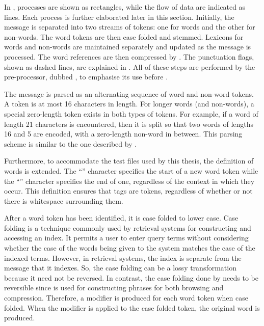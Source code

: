 In , processes are shown as
rectangles, while the flow of data are indicated as lines.
Each process is further elaborated later in this section.
Initially, the message is separated into two streams of tokens:
one for words and the other for non-words.  The word tokens are then
case folded and stemmed. Lexicons for words and non-words
are maintained separately and updated as the message is processed.  The word
references are then compressed by \repair.  The punctuation flags,
shown as dashed lines, are explained in .
All of these steps are performed by the 
pre-processor, dubbed \prepair, to emphasise its use before
\repair.


The message is parsed as an alternating sequence of word
and non-word tokens.  A token is at most 16 characters in
length.  For longer words (and non-words), a special
zero-length token exists in both types of tokens.  For
example, if a word of length 21 characters is encountered,
then it is split so that two words of lengths 16 and 5
are encoded, with a zero-length non-word in between.  
This parsing scheme is similar to the one described by 
\citet{moffat89:spe}.

Furthermore, to accommodate the \sgml test files used by this
thesis, the definition of words is extended.  The ``\tl''
character specifies the start of a new word token while 
the ``\tg'' character specifies the end of one, regardless of the
context in which they occur.  This definition 
ensures that \sgml tags are tokens, regardless of whether or not
there is whitespace surrounding them.


After a word token has been identified, it is case folded to 
lower case.   
Case folding is a technique commonly used by retrieval systems for 
constructing and accessing an index.
It permits a user to enter query terms 
without considering whether the case of the words 
being given to the system matches the case of the indexed terms.
However, in retrieval systems, the index is separate
from the message that it indexes.  So, the case folding can be a 
lossy transformation because it need not be reversed.  
In contrast, the case folding done by
\prepair needs to be reversible since \repair is used for
constructing phrases for both browsing and compression.  Therefore,
a modifier is
produced for each word token when case folded.  When the 
modifier is applied to the case folded token, the original 
word is produced.

